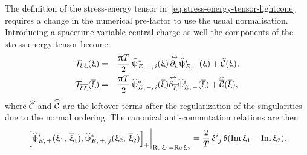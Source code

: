 The definition of the stress-energy tensor in~\eqref{eq:stress-energy-tensor-lightcone} requires a change in the numerical pre-factor to use the usual \cft normalisation.
Introducing a spacetime variable central charge as well the components of the stress-energy tensor become:\footnotemark{}
\begin{equation}
  \begin{split}
    \mathcal{T}_{\upxi \upxi}( \upxi )
    & =
    - \frac{\uppi T}{2}\,
    \widehat{\uppsi}_{E,\, +,\, i}^*( \upxi )\, \overset{\leftrightarrow}{\partial_{\upxi}} \widehat{\uppsi}^i_{E,\, +}( \upxi )
    +
    \widehat{\mathcal{C}}( \upxi ),
    \\
    \mathcal{T}_{\overline{\upxi} \overline{\upxi}}( \overline{\upxi} )
    & =
    - \frac{\uppi T}{2}\,
    \widehat{\uppsi}_{E,\, -,\, i}^*( \overline{\upxi} ) \overset{\leftrightarrow}{\partial_{\overline{\upxi}}}
    \widehat{\uppsi}^i_{E,\, -}( \overline{\upxi} )
    +
    \widehat{\overline{\mathcal{C}}}( \overline{\upxi} ),
  \end{split}
\end{equation}
where $\widehat{\mathcal{C}}$ and $\widehat{\overline{\mathcal{C}}}$ are the leftover terms after the regularization of the singularities due to the normal ordering.
The canonical anti-commutation relations are then
\begin{equation}
  \eval{
    \qty[
      \hpsi_{E,\, \pm}^i( \xi_1,\, \bxi_1),
      \hpsi_{E,\, \pm,\, j}^*( \xi_2,\, \bxi_2 )
    ]_+
  }_{\Re\xi_1 = \Re\xi_2}
  =
  \frac{2}{T}\,
  \tensor{\delta}{^i_j}\,
  \delta\qty( \Im\xi_1 - \Im\xi_2 ).
\end{equation}

